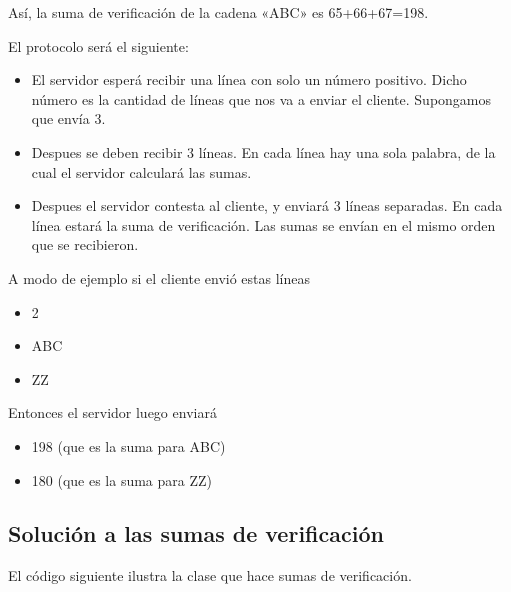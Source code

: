 \documentclass[letterpaper,10pt,spanish]{sphinxmanual}
\begin{document}
Así, la suma de verificación de la cadena «ABC» es 65+66+67=198.

El protocolo será el siguiente:
\begin{itemize}
\item {} 
El servidor esperá recibir una línea con solo un número positivo. Dicho número es la cantidad de líneas que nos va a enviar el cliente. Supongamos que envía 3.

\item {} 
Despues se deben recibir 3 líneas. En cada línea hay una sola palabra, de la cual el servidor calculará las sumas.

\item {} 
Despues el servidor contesta al cliente, y enviará 3 líneas separadas. En cada línea estará la suma de verificación. Las sumas se envían en el mismo orden que se recibieron.

\end{itemize}

A modo de ejemplo si el cliente envió estas líneas
\begin{itemize}
\item {} 
2

\item {} 
ABC

\item {} 
ZZ

\end{itemize}

Entonces el servidor luego enviará
\begin{itemize}
\item {} 
198 (que es la suma para ABC)

\item {} 
180 (que es la suma para ZZ)

\end{itemize}


\subsection{Solución a las sumas de verificación}
\label{\detokenize{textos/tema3:solucion-a-las-sumas-de-verificacion}}
El código siguiente ilustra la clase que hace sumas de verificación.
\end{document}
